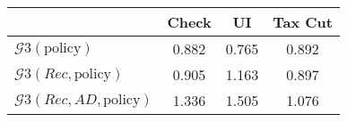 \begin{tabular}{@{}lccc@{}}
\toprule
                          & Check      & UI    & Tax Cut    \\  \midrule
$\mathcal{G}3(\text{policy})$ & 0.882  & 0.765  & 0.892     \\
$\mathcal{G}3(Rec,\text{policy})$ & 0.905  & 1.163  & 0.897     \\
$\mathcal{G}3(Rec, AD,\text{policy})$ & 1.336  & 1.505  & 1.076     \\
\end{tabular}
